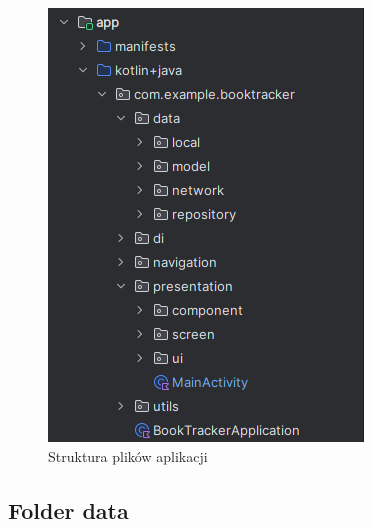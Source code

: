 \documentclass[12pt,twoside]{article}
\begin{document}
\begin{figure}[ht]
	\centering
	\includegraphics{figures/struktura.png}
	\caption{Struktura plików aplikacji}
\label{Fig:struktura}
\end{figure}

\subsection{Folder data}
\end{document}
